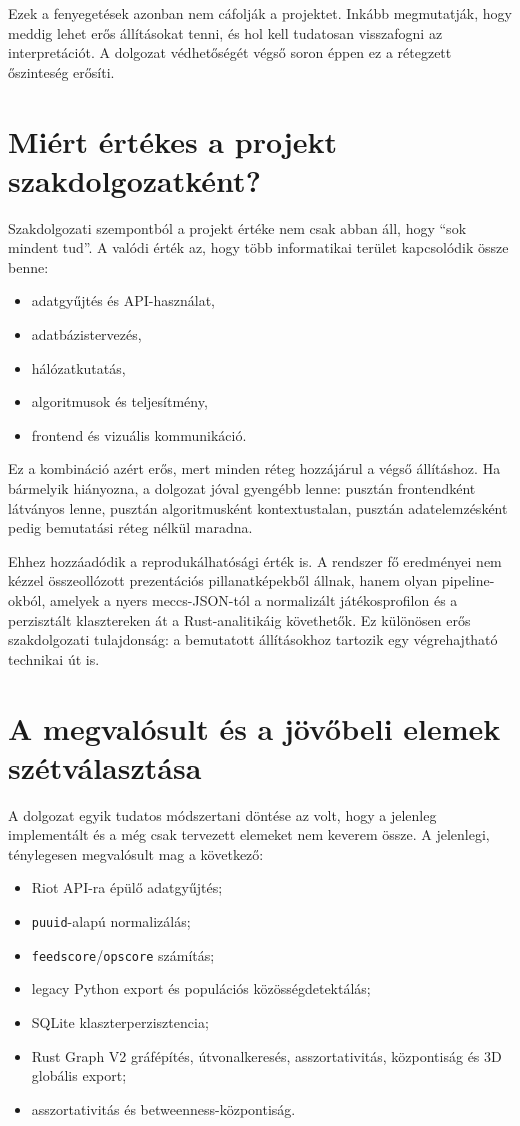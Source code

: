 ﻿\documentclass[a4paper,12pt]{report}
\begin{document}
Ezek a fenyegetések azonban nem cáfolják a projektet. Inkább megmutatják, hogy meddig lehet erős állításokat tenni, és hol kell tudatosan visszafogni az interpretációt. A dolgozat védhetőségét végső soron éppen ez a rétegzett őszinteség erősíti.

\section{Miért értékes a projekt szakdolgozatként?}

Szakdolgozati szempontból a projekt értéke nem csak abban áll, hogy ``sok mindent tud''. A valódi érték az, hogy több informatikai terület kapcsolódik össze benne:

\begin{itemize}
    \item adatgyűjtés és API-használat,
    \item adatbázistervezés,
    \item hálózatkutatás,
    \item algoritmusok és teljesítmény,
    \item frontend és vizuális kommunikáció.
\end{itemize}

Ez a kombináció azért erős, mert minden réteg hozzájárul a végső állításhoz. Ha bármelyik hiányozna, a dolgozat jóval gyengébb lenne: pusztán frontendként látványos lenne, pusztán algoritmusként kontextustalan, pusztán adatelemzésként pedig bemutatási réteg nélkül maradna.

Ehhez hozzáadódik a reprodukálhatósági érték is. A rendszer fő eredményei nem kézzel összeollózott prezentációs pillanatképekből állnak, hanem olyan pipeline-okból, amelyek a nyers meccs-JSON-tól a normalizált játékosprofilon és a perzisztált klasztereken át a Rust-analitikáig követhetők. Ez különösen erős szakdolgozati tulajdonság: a bemutatott állításokhoz tartozik egy végrehajtható technikai út is.

\section{A megvalósult és a jövőbeli elemek szétválasztása}

A dolgozat egyik tudatos módszertani döntése az volt, hogy a jelenleg implementált és a még csak tervezett elemeket nem keverem össze. A jelenlegi, ténylegesen megvalósult mag a következő:

\begin{itemize}
    \item Riot API-ra épülő adatgyűjtés;
    \item \texttt{puuid}-alapú normalizálás;
    \item \texttt{feedscore}/\texttt{opscore} számítás;
    \item legacy Python export és populációs közösségdetektálás;
    \item SQLite klaszterperzisztencia;
    \item Rust Graph V2 gráfépítés, útvonalkeresés, asszortativitás, központiság és 3D globális export;
    \item asszortativitás és betweenness-központiság.
\end{itemize}
\end{document}
